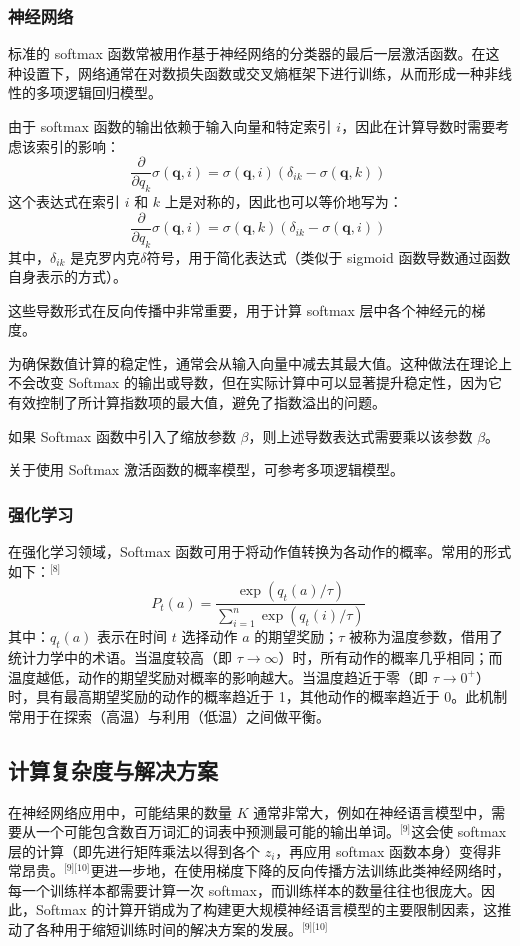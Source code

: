 \subsubsection{神经网络}
标准的 softmax 函数常被用作基于神经网络的分类器的最后一层激活函数。在这种设置下，网络通常在对数损失函数或交叉熵框架下进行训练，从而形成一种非线性的多项逻辑回归模型。

由于 softmax 函数的输出依赖于输入向量和特定索引 $i$，因此在计算导数时需要考虑该索引的影响：
$$
\frac{\partial}{\partial q_k} \sigma(\mathbf{q}, i) = \sigma(\mathbf{q}, i) \left( \delta_{ik} - \sigma(\mathbf{q}, k) \right)~
$$
这个表达式在索引 $i$ 和 $k$ 上是对称的，因此也可以等价地写为：
$$
\frac{\partial}{\partial q_k} \sigma(\mathbf{q}, i) = \sigma(\mathbf{q}, k) \left( \delta_{ik} - \sigma(\mathbf{q}, i) \right)~
$$
其中，$\delta_{ik}$ 是克罗内克$\delta$符号，用于简化表达式（类似于 sigmoid 函数导数通过函数自身表示的方式）。

这些导数形式在反向传播中非常重要，用于计算 softmax 层中各个神经元的梯度。

为确保数值计算的稳定性，通常会从输入向量中减去其最大值。这种做法在理论上不会改变 Softmax 的输出或导数，但在实际计算中可以显著提升稳定性，因为它有效控制了所计算指数项的最大值，避免了指数溢出的问题。

如果 Softmax 函数中引入了缩放参数 $\beta$，则上述导数表达式需要乘以该参数 $\beta$。

关于使用 Softmax 激活函数的概率模型，可参考多项逻辑模型。
\subsubsection{强化学习}
在强化学习领域，Softmax 函数可用于将动作值转换为各动作的概率。常用的形式如下：\(^\text{[8]}\)
$$
P_t(a) = \frac{\exp(q_t(a) / \tau)}{\sum_{i=1}^{n} \exp(q_t(i) / \tau)}~
$$
其中：$q_t(a)$ 表示在时间 $t$ 选择动作 $a$ 的期望奖励；$\tau$ 被称为温度参数，借用了统计力学中的术语。当温度较高（即 $\tau \to \infty$）时，所有动作的概率几乎相同；而温度越低，动作的期望奖励对概率的影响越大。当温度趋近于零（即 $\tau \to 0^+$）时，具有最高期望奖励的动作的概率趋近于 1，其他动作的概率趋近于 0。此机制常用于在探索（高温）与利用（低温）之间做平衡。
\subsection{计算复杂度与解决方案}
在神经网络应用中，可能结果的数量 $K$ 通常非常大，例如在神经语言模型中，需要从一个可能包含数百万词汇的词表中预测最可能的输出单词。\(^\text{[9]}\)这会使 softmax 层的计算（即先进行矩阵乘法以得到各个 $z_i$，再应用 softmax 函数本身）变得非常昂贵。\(^\text{[9][10]}\)更进一步地，在使用梯度下降的反向传播方法训练此类神经网络时，每一个训练样本都需要计算一次 softmax，而训练样本的数量往往也很庞大。因此，Softmax 的计算开销成为了构建更大规模神经语言模型的主要限制因素，这推动了各种用于缩短训练时间的解决方案的发展。\(^\text{[9][10]}\)

